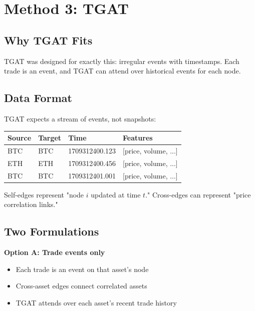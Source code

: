 \documentclass[11pt, a4paper]{article}
\begin{document}
\section{Method 3: TGAT}

\subsection{Why TGAT Fits}

TGAT was designed for exactly this: irregular events with timestamps. Each trade is an event, and TGAT can attend over historical events for each node.

\subsection{Data Format}

TGAT expects a stream of events, not snapshots:

\begin{center}
\begin{tabular}{llll}
\toprule
\textbf{Source} & \textbf{Target} & \textbf{Time} & \textbf{Features} \\
\midrule
BTC & BTC & 1709312400.123 & [price, volume, ...] \\
ETH & ETH & 1709312400.456 & [price, volume, ...] \\
BTC & BTC & 1709312401.001 & [price, volume, ...] \\
\bottomrule
\end{tabular}
\end{center}

Self-edges represent "node $i$ updated at time $t$." Cross-edges can represent "price correlation links."

\subsection{Two Formulations}

\textbf{Option A: Trade events only}
\begin{itemize}
    \item Each trade is an event on that asset's node
    \item Cross-asset edges connect correlated assets
    \item TGAT attends over each asset's recent trade history
\end{itemize}
\end{document}
